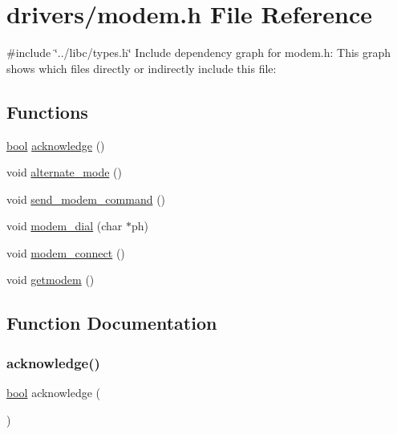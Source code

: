 \hypertarget{a00041}{}\section{drivers/modem.h File Reference}
\label{a00041}
{\ttfamily \#include \char`\"{}../libc/types.\+h\char`\"{}}\newline
Include dependency graph for modem.\+h\+:
This graph shows which files directly or indirectly include this file\+:
\subsection*{Functions}
\begin{DoxyCompactItemize}
\item 
\hyperlink{a00134_af6a258d8f3ee5206d682d799316314b1_af6a258d8f3ee5206d682d799316314b1}{bool} \hyperlink{a00041_a8529dba543149138317e327931bf5a5c_a8529dba543149138317e327931bf5a5c}{acknowledge} ()
\item 
void \hyperlink{a00041_ace378eaa88c0b7f0cdafe97d064e36fb_ace378eaa88c0b7f0cdafe97d064e36fb}{alternate\+\_\+mode} ()
\item 
void \hyperlink{a00041_adf147e13a3c0b23148f4eb1db184f68d_adf147e13a3c0b23148f4eb1db184f68d}{send\+\_\+modem\+\_\+command} ()
\item 
void \hyperlink{a00041_ab1123a026be8f7d0ece72e2813222da0_ab1123a026be8f7d0ece72e2813222da0}{modem\+\_\+dial} (char $\ast$ph)
\item 
void \hyperlink{a00041_a283a7e4b715971478687b2d7547780cb_a283a7e4b715971478687b2d7547780cb}{modem\+\_\+connect} ()
\item 
void \hyperlink{a00041_a5e56e19ccc8f36690d515dd09948db10_a5e56e19ccc8f36690d515dd09948db10}{getmodem} ()
\end{DoxyCompactItemize}


\subsection{Function Documentation}
\mbox{\label{a00041_a8529dba543149138317e327931bf5a5c_a8529dba543149138317e327931bf5a5c}} 
\subsubsection{\texorpdfstring{acknowledge()}{acknowledge()}}
{\footnotesize\ttfamily \hyperlink{a00134_af6a258d8f3ee5206d682d799316314b1_af6a258d8f3ee5206d682d799316314b1}{bool} acknowledge (\begin{DoxyParamCaption}{ }\end{DoxyParamCaption})}




